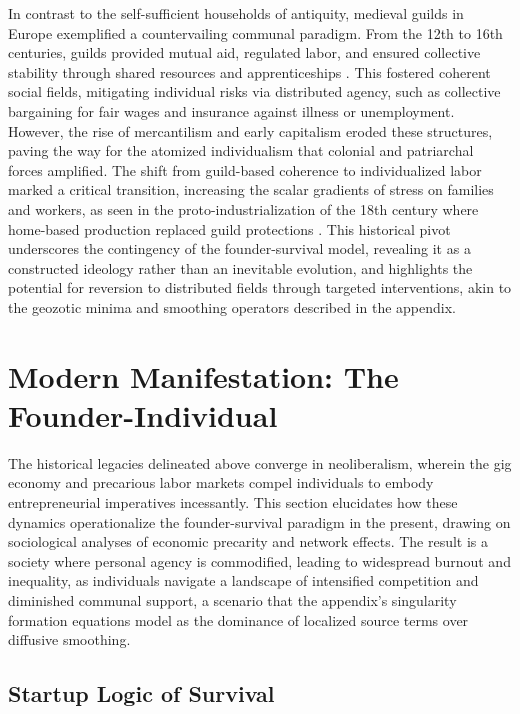 \documentclass[11pt]{article}
\begin{document}
In contrast to the self-sufficient households of antiquity, medieval guilds in Europe exemplified a countervailing communal paradigm. From the 12th to 16th centuries, guilds provided mutual aid, regulated labor, and ensured collective stability through shared resources and apprenticeships \citep{thompson1963making}. This fostered coherent social fields, mitigating individual risks via distributed agency, such as collective bargaining for fair wages and insurance against illness or unemployment. However, the rise of mercantilism and early capitalism eroded these structures, paving the way for the atomized individualism that colonial and patriarchal forces amplified. The shift from guild-based coherence to individualized labor marked a critical transition, increasing the scalar gradients of stress on families and workers, as seen in the proto-industrialization of the 18th century where home-based production replaced guild protections \citep{pomeranz2000great}. This historical pivot underscores the contingency of the founder-survival model, revealing it as a constructed ideology rather than an inevitable evolution, and highlights the potential for reversion to distributed fields through targeted interventions, akin to the geozotic minima and smoothing operators described in the appendix.

\section{Modern Manifestation: The Founder-Individual}

The historical legacies delineated above converge in neoliberalism, wherein the gig economy and precarious labor markets compel individuals to embody entrepreneurial imperatives incessantly. This section elucidates how these dynamics operationalize the founder-survival paradigm in the present, drawing on sociological analyses of economic precarity and network effects. The result is a society where personal agency is commodified, leading to widespread burnout and inequality, as individuals navigate a landscape of intensified competition and diminished communal support, a scenario that the appendix's singularity formation equations model as the dominance of localized source terms over diffusive smoothing.

\subsection{Startup Logic of Survival}
\end{document}
